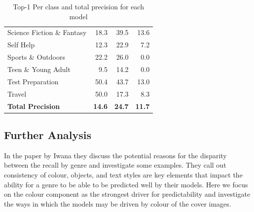 \documentclass[12pt]{article}
\numberwithin{equation}{section}
\numberwithin{figure}{section}
\begin{document}
\begin{table}[]
{\begin{tabular}{lrrr}
	Science Fiction \& Fantasy    & 18.3                                     & 39.5                                            & 13.6                                   \\
	Self Help                     & 12.3                                     & 22.9                                            & 7.2                                    \\
	Sports \& Outdoors            & 22.2                                     & 26.0                                            & 0.0                                    \\
	Teen \& Young Adult           & 9.5                                      & 14.2                                            & 0.0                                    \\
	Test Preparation              & 50.4                                     & 43.7                                            & 13.0                                   \\
	Travel                        & 50.0                                     & 17.3                                            & 8.3                                    \\ \hline
	\textbf{Total Precision}      & \textbf{14.6}                            & \textbf{24.7}                                   & \textbf{11.7}                          \\ \hline
	\end{tabular}%
	}
	\caption{Top-1 Per class and total precision for each model}
	\label{tab:test_prec}
	\end{table}

\subsection{Further Analysis} 
\label{sub:Further_Analysis} 
In the paper by Iwana they discuss the potential reasons for the disparity between the recall by genre and investigate some examples. They call out consistency of colour, objects, and text styles are key elements that impact the ability for a genre to be able to be predicted well by their models. Here we focus on the colour component as the strongest driver for predictability and investigate the ways in which the models may be driven by colour of the cover images.
\end{document}

